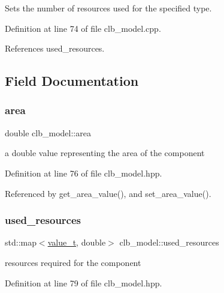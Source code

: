 Sets the number of resources used for the specified type. 



Definition at line 74 of file clb\+\_\+model.\+cpp.



References used\+\_\+resources.



\subsection{Field Documentation}
\mbox{\label{classclb__model_a5f5d1352275ca153641e67dd778cd3e7}} 
\subsubsection{\texorpdfstring{area}{area}}
{\footnotesize\ttfamily double clb\+\_\+model\+::area\hspace{0.3cm}{\ttfamily [protected]}}



a double value representing the area of the component 



Definition at line 76 of file clb\+\_\+model.\+hpp.



Referenced by get\+\_\+area\+\_\+value(), and set\+\_\+area\+\_\+value().

\mbox{\label{classclb__model_a353dd5b03f3085fd4571f966c96c814c}} 
\subsubsection{\texorpdfstring{used\+\_\+resources}{used\_resources}}
{\footnotesize\ttfamily std\+::map$<$\hyperlink{classclb__model_a11a81df139e5752535807c276badbe21}{value\+\_\+t}, double$>$ clb\+\_\+model\+::used\+\_\+resources\hspace{0.3cm}{\ttfamily [protected]}}



resources required for the component 



Definition at line 79 of file clb\+\_\+model.\+hpp.



